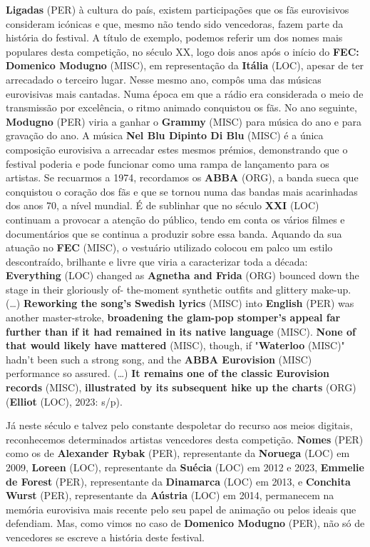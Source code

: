 \documentclass[12pt,a4paper]{article}
\begin{document}
\textbf{Ligadas} (PER) à cultura do país, existem participações que os fãs eurovisivos consideram icónicas e que, mesmo não tendo sido vencedoras, fazem parte da história do festival. A título de exemplo, podemos referir um dos nomes mais populares desta competição, no século XX, logo dois anos após o início do \textbf{FEC: Domenico Modugno} (MISC), em representação da \textbf{Itália} (LOC), apesar de ter arrecadado o terceiro lugar. Nesse mesmo ano, compôs uma das músicas eurovisivas mais cantadas. Numa época em que a rádio era considerada o meio de  transmissão  por  excelência,  o  ritmo  animado  conquistou  os  fãs.  No  ano  seguinte, \textbf{Modugno} (PER) viria a ganhar o \textbf{Grammy} (MISC) para música do ano e para gravação do ano. A música \textbf{Nel  Blu  Dipinto  Di  Blu} (MISC) é  a  única  composição  eurovisiva  a  arrecadar  estes  mesmos prémios,  demonstrando  que  o  festival  poderia  e  pode  funcionar  como  uma  rampa  de lançamento para os artistas. Se recuarmos a 1974, recordamos os \textbf{ABBA} (ORG), a banda sueca que conquistou o coração dos fãs e que se tornou numa das bandas mais acarinhadas dos anos  70,  a  nível  mundial.  É  de  sublinhar  que  no  século  \textbf{XXI} (LOC)  continuam  a  provocar  a atenção do público, tendo em conta os vários filmes e documentários que se continua a produzir sobre essa banda. Aquando da sua atuação no \textbf{FEC} (MISC), o vestuário utilizado colocou em palco um estilo descontraído, brilhante e livre que viria a caracterizar toda a década: \textbf{Everything} (LOC) changed as \textbf{Agnetha and Frida} (ORG) bounced down the stage in their gloriously of- the-moment synthetic outfits and glittery make-up. (…)  \textbf{Reworking the song's Swedish lyrics} (MISC) into \textbf{English} (PER) was another master-stroke, \textbf{broadening the glam-pop stomper's appeal far further than if it had remained in its native language} (MISC). \textbf{None of that would likely have mattered} (MISC),  though,  if  "\textbf{Waterloo} (MISC)"  hadn't  been  such  a  strong  song,  and  the  \textbf{ABBA Eurovision} (MISC) performance so assured. (…) \textbf{It remains one of the classic Eurovision records} (MISC), \textbf{illustrated by its subsequent hike up the charts} (ORG) (\textbf{Elliot} (LOC), 2023: s/p).

Já neste século e talvez pelo constante despoletar do recurso aos meios digitais, reconhecemos  determinados  artistas  vencedores  desta  competição.  \textbf{Nomes} (PER)  como  os  de \textbf{Alexander Rybak} (PER), representante da \textbf{Noruega} (LOC) em 2009, \textbf{Loreen} (LOC), representante da \textbf{Suécia} (LOC) em 2012 e 2023, \textbf{Emmelie de Forest} (PER), representante da \textbf{Dinamarca} (LOC) em 2013, e \textbf{Conchita Wurst} (PER),  representante  da  \textbf{Aústria} (LOC)  em  2014,  permanecem  na  memória  eurovisiva  mais recente pelo seu papel de animação ou pelos ideais que defendiam. Mas, como vimos no caso de \textbf{Domenico Modugno} (PER), não só de vencedores se escreve a história deste festival.
\end{document}

